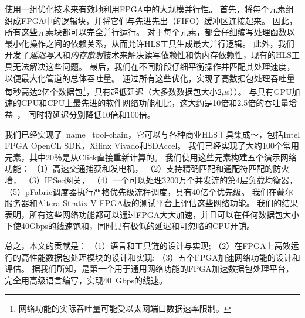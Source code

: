\name{}使用一组优化技术来有效地利用FPGA中的大规模并行性。
首先，\name{}将每个元素组织成FPGA中的逻辑块，并将它们与先进先出（FIFO）缓冲区连接起来。
因此，所有这些元素块都可以完全并行运行。
对于每个元素，都会仔细编写处理函数以最小化操作之间的依赖关系，从而允许HLS工具生成最大并行逻辑。
此外，我们开发了\textit {延迟写入}和\textit {内存散射}技术来解决读写依赖性和伪内存依赖性，现有的HLS工具无法解决这些问题。
最后，我们在不同阶段仔细平衡操作并匹配其处理速度，以便最大化管道的总体吞吐量。
通过所有这些优化，\name{}实现了高数据包处理吞吐量
每秒高达2亿个数据包\footnote {\name{} 网络功能的实际吞吐量可能受以太网端口数据速率限制。}，具有超低延迟（大多数数据包大小$ 2 \mu$s））。
与具有GPU加速的CPU和CPU上最先进的软件网络功能相比，这大约是10倍和2.5倍的吞吐量增益~\cite {packetshader}，
同时将延迟分别降低10倍和100倍。

我们已经实现了\ name \ tool-chain，它可以与各种商业HLS工具集成〜\cite {vivado,aoc}，包括Intel FPGA OpenCL SDK，Xilinx Vivado和SDAccel。
我们已经实现了大约100个常用元素，其中20％是从Click直接重新计算的。
我们使用这些元素构建五个演示网络功能：
（1）高速交通捕获和发电机，
（2）支持精确匹配和通配符匹配的防火墙，
（3）IPSec网关，
（4）一个可以处理3200万个并发流的第4层负载均衡器，
（5）pFabric调度器\cite {pfabric}执行严格优先级流程调度，具有40亿个优先级。
我们在戴尔服务器和Altera Stratix V FPGA板的测试平台上评估这些网络功能\cite {putnam2014reconfigurable}。
我们的结果表明，所有这些网络功能都可以通过FPGA大大加速，并且可以在任何数据包大小下使40Gbps的线速饱和，同时具有极低的延迟和可忽略的CPU开销。

总之，本文的贡献是：
（1）\name 语言和工具链的设计与实现;
（2）在FPGA上高效运行的高性能数据包处理模块的设计和实现;
（3）五个FPGA加速网络功能的设计和评估。
据我们所知，\name 是第一个用于通用网络功能的FPGA加速数据包处理平台，完全用高级语言编写，实现40~Gbps的线速。

